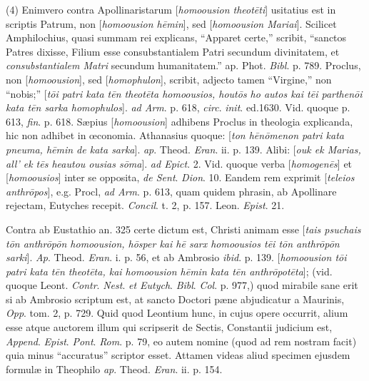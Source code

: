 (4) Enimvero contra Apollinaristarum [\emph{homoousion
theot\={e}ti}] usitatius est in scriptis Patrum, non [\emph{homoousion
h\={e}min}], sed [\emph{homoousion Mariai}]. Scilicet
Amphilochius, quasi summam rei explicans, ``Apparet certe,'' scribit, ``sanctos
Patres dixisse, Filium esse consubstantialem Patri secundum
divinitatem, et \emph{consubstantialem Matri} secundum humanitatem.''
ap. Phot. \emph{Bibl}. p. 789. Proclus, non [\emph{homoousion}], sed
[\emph{homophulon}], scribit, adjecto tamen ``Virgine,'' non ``nobis;''
[\emph{t\={o}i patri kata t\={e}n theot\={e}ta homoousios, hout\={o}s
ho autos kai t\={e}i parthen\={o}i kata t\={e}n sarka
homophulos}]. \emph{ad Arm}. p. 618, \emph{circ}. \emph{init}.
ed.1630. Vid. quoque p. 613, \emph{fin}. p. 618. Sæpius [\emph{homoousion}]
adhibens Proclus in theologia explicanda, hic non adhibet in œconomia.
Athanasius quoque: [\emph{ton h\={e}n\={o}menon patri kata pneuma,
h\={e}min de kata sarka}]. \emph{ap}. Theod. \emph{Eran}. ii. p.
139. Alibi: [\emph{ouk ek Marias, all' ek t\={e}s heautou ousias s\={o}ma}].
\emph{ad Epict}. 2. Vid. quoque verba [\emph{homogen\={e}s}] et [\emph{homoousios}]
inter se opposita, \emph{de Sent}. \emph{Dion}. 10. Eandem rem
exprimit [\emph{teleios anthr\={o}pos}], e.g. Procl, \emph{ad Arm}.
p. 613, quam quidem phrasin, ab Apollinare rejectam, Eutyches recepit.
\emph{Concil}. t. 2, p. 157. Leon. \emph{Epist}. 21.

Contra ab Eustathio an. 325 certe dictum est,
Christi animam esse [\emph{tais psuchais t\={o}n anthr\={o}p\={o}n
homoousion, h\={o}sper kai h\={e} sarx homoousios t\={e}i t\={o}n
anthr\={o}p\={o}n sarki}]. \emph{Ap}. Theod. \emph{Eran}. i.
p. 56, et ab Ambrosio \emph{ibid}. p. 139. [\emph{homoousion t\={o}i
patri kata t\={e}n theot\={e}ta, kai homoousion h\={e}min
kata t\={e}n anthr\={o}pot\={e}ta}]; (vid. quoque Leont. \emph{Contr}.
\emph{Nest}. \emph{et Eutych}. \emph{Bibl}. \emph{Col}. p. 977,) quod
mirabile sane erit si ab Ambrosio scriptum est, at sancto Doctori pæne
abjudicatur a Maurinis, \emph{Opp}. tom. 2, p. 729. Quid quod Leontium
hunc, in cujus opere occurrit, alium esse atque auctorem illum
qui scripserit de Sectis, Constantii judicium est, \emph{Append}. \emph{Epist}.
\emph{Pont}. \emph{Rom}. p. 79, eo autem nomine (quod ad rem nostram
facit) quia minus ``accuratus'' scriptor esset. Attamen videas aliud
specimen ejusdem formulæ in Theophilo \emph{ap}. Theod. \emph{Eran}.
ii. p. 154.

